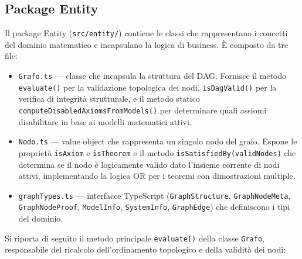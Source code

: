 \documentclass[12pt,a4paper]{article}
\begin{document}
\subsection{Package Entity}
Il package Entity (\texttt{src/entity/}) contiene le classi che rappresentano i concetti del dominio matematico e incapsulano la logica di business. È composto da tre file:

\begin{itemize}
    \item \texttt{Grafo.ts} — classe che incapsula la struttura del DAG. Fornisce il metodo \texttt{evaluate()} per la validazione topologica dei nodi, \texttt{isDagValid()} per la verifica di integrità strutturale, e il metodo statico \texttt{computeDisabledAxiomsFromModels()} per determinare quali assiomi disabilitare in base ai modelli matematici attivi.
    \item \texttt{Nodo.ts} — value object che rappresenta un singolo nodo del grafo. Espone le proprietà \texttt{isAxiom} e \texttt{isTheorem} e il metodo \texttt{isSatisfiedBy(validNodes)} che determina se il nodo è logicamente valido dato l'insieme corrente di nodi attivi, implementando la logica OR per i teoremi con dimostrazioni multiple.
    \item \texttt{graphTypes.ts} — interfacce TypeScript (\texttt{GraphStructure}, \texttt{GraphNodeMeta}, \texttt{GraphNodeProof}, \texttt{ModelInfo}, \texttt{SystemInfo}, \texttt{GraphEdge}) che definiscono i tipi del dominio.
\end{itemize}

Si riporta di seguito il metodo principale \texttt{evaluate()} della classe \texttt{Grafo}, responsabile del ricalcolo dell'ordinamento topologico e della validità dei nodi:
\end{document}
